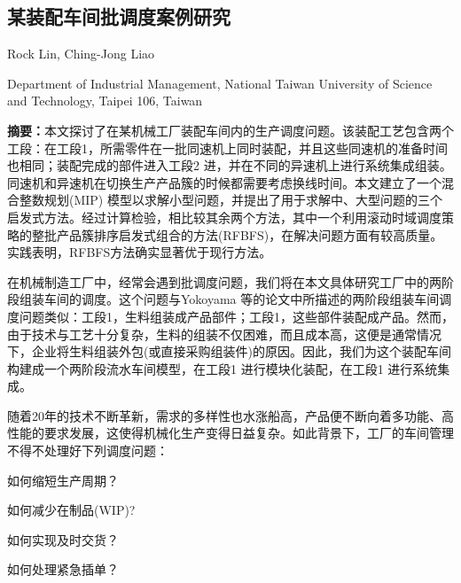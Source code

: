 \begin{Abstract}
\chapter*{某装配车间批调度案例研究}
\begin{center}
\vspace{2mm}
{
 {\xiaosi Rock Lin, Ching-Jong Liao}

 {\xiaowu Department of Industrial Management, National Taiwan University of Science and Technology, Taipei 106, Taiwan}
}
\end{center}
{\songti
\noindent \xiaowu\textbf{摘要：}本文探讨了在某机械工厂装配车间内的生产调度问题。该装配工艺包含两个工段：在工段1，所需零件在一批同速机上同时装配，并且这些同速机的准备时间也相同；装配完成的部件进入工段2 进，并在不同的异速机上进行系统集成组装。同速机和异速机在切换生产产品簇的时候都需要考虑换线时间。本文建立了一个混合整数规划(MIP) 模型以求解小型问题，并提出了用于求解中、大型问题的三个启发式方法。经过计算检验，相比较其余两个方法，其中一个利用滚动时域调度策略的整批产品簇排序启发式组合的方法(RFBFS)，在解决问题方面有较高质量。实践表明，RFBFS方法确实显著优于现行方法。

}
\end{Abstract}

在机械制造工厂中，经常会遇到批调度问题，我们将在本文具体研究工厂中的两阶段组装车间的调度。这个问题与Yokoyama 等的论文中所描述的两阶段组装车间调度问题类似：工段1，生料组装成产品部件；工段1，这些部件装配成产品。然而，由于技术与工艺十分复杂，生料的组装不仅困难，而且成本高，这便是通常情况下，企业将生料组装外包(或直接采购组装件)的原因。因此，我们为这个装配车间构建成一个两阶段流水车间模型，在工段1 进行模块化装配，在工段1 进行系统集成。

随着20年的技术不断革新，需求的多样性也水涨船高，产品便不断向着多功能、高性能的要求发展，这使得机械化生产变得日益复杂。如此背景下，工厂的车间管理不得不处理好下列调度问题：
\begin{compactenum}[(1)]
\item 如何缩短生产周期？
\item 如何减少在制品(WIP)?
\item 如何实现及时交货？
\item 如何处理紧急插单？
\end{compactenum}


